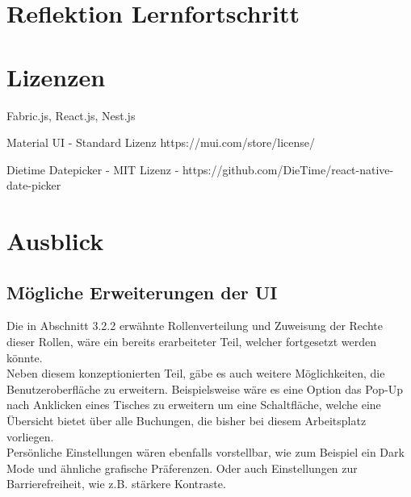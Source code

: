 \section{Reflektion Lernfortschritt}

\section{Lizenzen}

Fabric.js, React.js, Nest.js

Material UI - Standard Lizenz https://mui.com/store/license/

Dietime Datepicker - MIT Lizenz - https://github.com/DieTime/react-native-date-picker

\section{Ausblick}

\subsection{Mögliche Erweiterungen der UI}

Die in Abschnitt 3.2.2 erwähnte Rollenverteilung und Zuweisung der Rechte dieser Rollen, wäre ein bereits erarbeiteter Teil, welcher fortgesetzt werden könnte.
\\
Neben diesem konzeptionierten Teil, gäbe es auch weitere Möglichkeiten, die Benutzeroberfläche zu erweitern.
Beispielsweise wäre es eine Option das Pop-Up nach Anklicken eines Tisches zu erweitern um eine Schaltfläche, welche eine Übersicht bietet über alle Buchungen, die bisher bei diesem Arbeitsplatz vorliegen.
\\
Persönliche Einstellungen wären ebenfalls vorstellbar, wie zum Beispiel ein Dark Mode und ähnliche grafische Präferenzen. Oder auch Einstellungen zur Barrierefreiheit, wie z.B. stärkere Kontraste.
